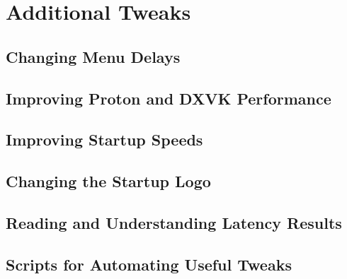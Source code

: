 \chapter{Additional Tweaks}
\localtableofcontents
\clearpage

\section{Changing Menu Delays}

\linebreak

\section{Improving Proton and DXVK Performance}

\linebreak

\section{Improving Startup Speeds}

\linebreak

\section{Changing the Startup Logo}

\linebreak

\section{Reading and Understanding Latency Results}

\linebreak

\section{Scripts for Automating Useful Tweaks}

\linebreak